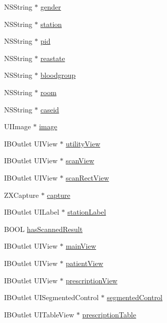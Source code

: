 \begin{DoxyCompactItemize}
\item 
N\+S\+String $\ast$ \hyperlink{interface_patient_view_controller_af88192a4ffdea0941a06317aa61423c6}{gender}
\item 
N\+S\+String $\ast$ \hyperlink{interface_patient_view_controller_a8f8b7d70361185915526eef8d0ae605b}{station}
\item 
N\+S\+String $\ast$ \hyperlink{interface_patient_view_controller_a54160ca7411cb114520bc4b0ae56551e}{pid}
\item 
N\+S\+String $\ast$ \hyperlink{interface_patient_view_controller_a72468da76036a9488618a69465b69827}{reastate}
\item 
N\+S\+String $\ast$ \hyperlink{interface_patient_view_controller_a4538a82102e16bd3f2712c877bd9faea}{bloodgroup}
\item 
N\+S\+String $\ast$ \hyperlink{interface_patient_view_controller_aa65cb56326a9bbeb78c9b10172cfc01c}{room}
\item 
N\+S\+String $\ast$ \hyperlink{interface_patient_view_controller_a9562804261557424fa05ae41e73a70f5}{caseid}
\item 
U\+I\+Image $\ast$ \hyperlink{interface_patient_view_controller_a0552caf5f04effbd331af5816985f03c}{image}
\item 
I\+B\+Outlet U\+I\+View $\ast$ \hyperlink{interface_patient_view_controller_aef3bd4cf26a022b5b5cecb2976e72920}{utility\+View}
\item 
I\+B\+Outlet U\+I\+View $\ast$ \hyperlink{interface_patient_view_controller_aeea16cb49a3684ca14250a439f6a69ca}{scan\+View}
\item 
I\+B\+Outlet U\+I\+View $\ast$ \hyperlink{interface_patient_view_controller_a901293b287634f24a6fd42800069098a}{scan\+Rect\+View}
\item 
Z\+X\+Capture $\ast$ \hyperlink{interface_patient_view_controller_ae266fd8650c45e502a1a626d8af13618}{capture}
\item 
I\+B\+Outlet U\+I\+Label $\ast$ \hyperlink{interface_patient_view_controller_a22bfc7a8180b3ea86643917b4c772333}{station\+Label}
\item 
B\+O\+O\+L \hyperlink{interface_patient_view_controller_a29feb452b2f29cd57fb8690fa7639546}{has\+Scanned\+Result}
\item 
I\+B\+Outlet U\+I\+View $\ast$ \hyperlink{interface_patient_view_controller_a3616c642880c65d15f5b0fc38fa01eb9}{main\+View}
\item 
I\+B\+Outlet U\+I\+View $\ast$ \hyperlink{interface_patient_view_controller_a004431d6cb69fce5b91e85ba4262b982}{patient\+View}
\item 
I\+B\+Outlet U\+I\+View $\ast$ \hyperlink{interface_patient_view_controller_a5e769391d88bd8e9c4124ceff8882291}{prescription\+View}
\item 
I\+B\+Outlet U\+I\+Segmented\+Control $\ast$ \hyperlink{interface_patient_view_controller_aed02d7fb5b20f35baf6d768e6d74ca2b}{segmented\+Control}
\item 
I\+B\+Outlet U\+I\+Table\+View $\ast$ \hyperlink{interface_patient_view_controller_ad7cdfbb763e9ad87ce978b28e11b43cb}{prescription\+Table}
\end{DoxyCompactItemize}


